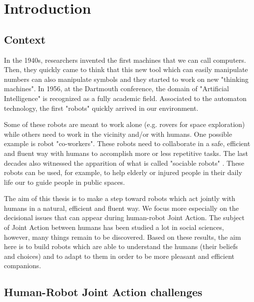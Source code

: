 \documentclass[english,a4paper,11pt,twoside]{StyleThese}
\begin{document}
\dominitoc
\faketableofcontents
\fi


\chapter*{Introduction}
\minitoc

\section*{Context}

In the 1940s, researchers invented the first machines that we can call computers. Then, they quickly came to think that this new tool which can easily manipulate numbers can also manipulate symbols and they started to work on new "thinking machines". In 1956, at the Dartmouth conference, the domain of "Artificial Intelligence" is recognized as a fully academic field. Associated to the automaton technology, the first "robots" quickly arrived in our environment.

Some of these robots are meant to work alone (e.g. rovers for space exploration) while others need to work in the vicinity and/or with humans. One possible example is robot "co-workers". These robots need to collaborate in a safe, efficient and fluent way with humans to accomplish more or less repetitive tasks. The last decades also witnessed the apparition of what is called "sociable robots" \cite{dautenhahn2007socially}. These robots can be used, for example, to help elderly or injured people in their daily life our to guide people in public spaces. 

The aim of this thesis is to make a step toward robots which act jointly with humans in a natural, efficient and fluent way. We focus more especially on the decisional issues that can appear during human-robot Joint Action. The subject of Joint Action between humans has been studied a lot in social sciences, however, many things remain to be discovered. Based on these results, the aim here is to build robots which are able to understand the humans (their beliefs and choices) and to adapt to them in order to be more pleasant and efficient companions.

\newpage
\section*{Human-Robot Joint Action challenges}
\end{document}
